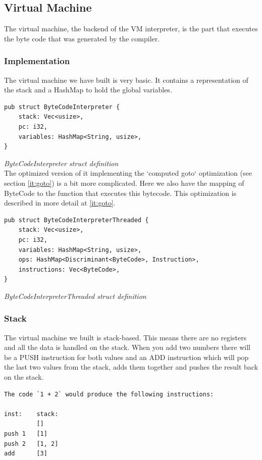 \documentclass{article}
\begin{document}
\subsection{Virtual Machine}
The virtual machine, the backend of the VM interpreter, is the part that
executes the byte code that was generated by the compiler.

\subsubsection{Implementation}
The virtual machine we have built is very basic. It contains a representation
of the stack and a HashMap to hold the global variables.

\begin{verbatim}
pub struct ByteCodeInterpreter {
    stack: Vec<usize>,
    pc: i32,
    variables: HashMap<String, usize>,
}
\end{verbatim}
\textit{ByteCodeInterpreter struct definition} \\

The optimized version of it implementing the `computed goto` optimization (see
section \ref{it:goto}) is a bit more complicated. Here we also have the mapping
of ByteCode to the function that executes this bytecode. This optimization is 
described in more detail at \ref{it:goto}.

\begin{verbatim}
pub struct ByteCodeInterpreterThreaded {
    stack: Vec<usize>,
    pc: i32,
    variables: HashMap<String, usize>,
    ops: HashMap<Discriminant<ByteCode>, Instruction>,
    instructions: Vec<ByteCode>,
}
\end{verbatim}
\textit{ByteCodeInterpreterThreaded struct definition} \\

\subsubsection{Stack}
The virtual machine we built is stack-based. This means there are no registers
and all the data is handled on the stack. When you add two numbers there will
be a PUSH instruction for both values and an ADD instruction which will pop the
last two values from the stack, adds them together and pushes the result back
on the stack.

\begin{verbatim}
The code `1 + 2` would produce the following instructions:

inst:    stack:
         []
push 1   [1]
push 2   [1, 2]
add      [3]
\end{verbatim}
\end{document}
